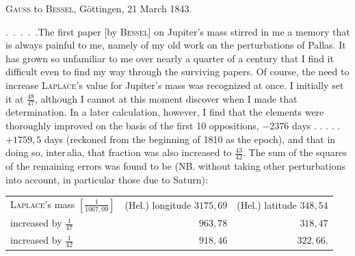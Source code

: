 \par{}\bigskip
\begin{center}
\textsc{Gauss} to \textsc{Bessel}, Göttingen, 21 March 1843.
\end{center}
\noindent\hspace*{\parindent}\mbox{. . . . .}\quad The first paper [by \textsc{Bessel}] on Jupiter's mass stirred in me a memory that is always painful to me, namely of my old work on the perturbations of Pallas. It has grown so unfamiliar to me over nearly a quarter of a century that I find it difficult even to find my way through the surviving papers. Of course, the need to increase \textsc{Laplace}'s value for Jupiter's mass was recognized at once. I initially set it at \(\frac{48}{47}\), although I cannot at this moment discover when I made that determination. In a later calculation, however, I find that the elements were thoroughly improved on the basis of the first 10 oppositions, \(-2376\) days . . . . . \(+1759{,}5\) days (reckoned from the beginning of 1810 as the epoch), and that in doing so, inter\,alia, that fraction was also increased to \(\frac{43}{42}\). The sum of the squares of the remaining errors was found to be (NB. without taking other perturbations into account, in particular those due to Saturn):
\begin{center}
\renewcommand{\arraystretch}{1.3}
\setlength{\tabcolsep}{5pt}
\begin{tabular}{@{}lrr@{}}
\textsc{Laplace}'s mass \(\left[\frac{1}{1067{,}09}\right]\) & (Hel.) longitude \(3175{,}69\) & (Hel.) latitude \(348{,}54\) \\
increased by \(\frac{1}{47}\) & \(963{,}78\) & \(318{,}47\) \\
increased by \(\frac{1}{42}\) & \(918{,}46\) & \(322{,}66\).
\end{tabular}
\end{center}
